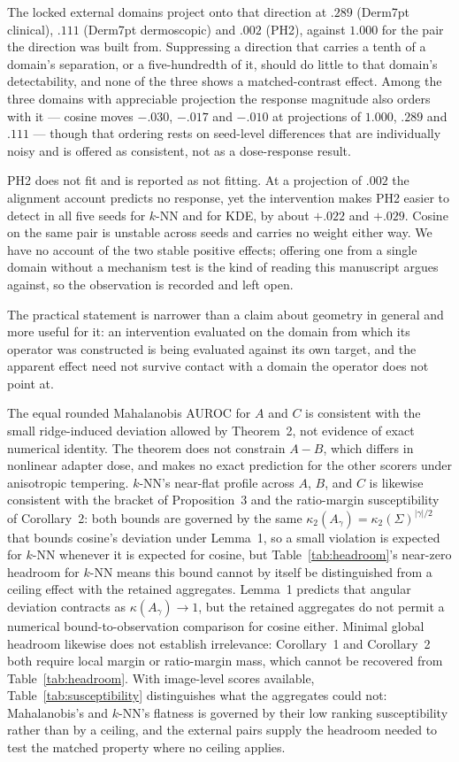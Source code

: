 \documentclass[11pt,a4paper]{article}
\begin{document}
The locked external domains project onto that direction at $.289$ (Derm7pt
clinical), $.111$ (Derm7pt dermoscopic) and $.002$ (PH2), against $1.000$ for
the pair the direction was built from. Suppressing a direction that carries a
tenth of a domain's separation, or a five-hundredth of it, should do little to
that domain's detectability, and none of the three shows a matched-contrast
effect. Among the three domains with appreciable projection the response
magnitude also orders with it --- cosine moves $-.030$, $-.017$ and $-.010$ at
projections of $1.000$, $.289$ and $.111$ --- though that ordering rests on
seed-level differences that are individually noisy and is offered as
consistent, not as a dose-response result.

PH2 does not fit and is reported as not fitting. At a projection of $.002$ the
alignment account predicts no response, yet the intervention makes PH2 easier
to detect in all five seeds for $k$-NN and for KDE, by about $+.022$ and
$+.029$. Cosine on the same pair is unstable across seeds and carries no weight
either way. We have no account of the two stable positive effects; offering one
from a single domain without a mechanism test is the kind of reading this
manuscript argues against, so the observation is recorded and left open.

The practical statement is narrower than a claim about geometry in general and
more useful for it: an intervention evaluated on the domain from which its
operator was constructed is being evaluated against its own target, and the
apparent effect need not survive contact with a domain the operator does not
point at.

The equal rounded Mahalanobis AUROC for $A$ and $C$ is consistent with the small ridge-induced deviation allowed by Theorem~2, not evidence of exact numerical identity. The theorem does not constrain $A-B$, which differs in nonlinear adapter dose, and makes no exact prediction for the other scorers under anisotropic tempering. $k$-NN's near-flat profile across $A$, $B$, and $C$ is likewise consistent with the bracket of Proposition~3 and the ratio-margin susceptibility of Corollary~2: both bounds are governed by the same $\kappa_2(A_\gamma)=\kappa_2(\Sigma)^{|\gamma|/2}$ that bounds cosine's deviation under Lemma~1, so a small violation is expected for $k$-NN whenever it is expected for cosine, but Table~\ref{tab:headroom}'s near-zero headroom for $k$-NN means this bound cannot by itself be distinguished from a ceiling effect with the retained aggregates. Lemma~1 predicts that angular deviation contracts as $\kappa(A_\gamma)\rightarrow1$, but the retained aggregates do not permit a numerical bound-to-observation comparison for cosine either. Minimal global headroom likewise does not establish irrelevance: Corollary~1 and Corollary~2 both require local margin or ratio-margin mass, which cannot be recovered from Table~\ref{tab:headroom}. With image-level scores available, Table~\ref{tab:susceptibility} distinguishes what the aggregates could not: Mahalanobis's and $k$-NN's flatness is governed by their low ranking susceptibility rather than by a ceiling, and the external pairs supply the headroom needed to test the matched property where no ceiling applies.
\end{document}
